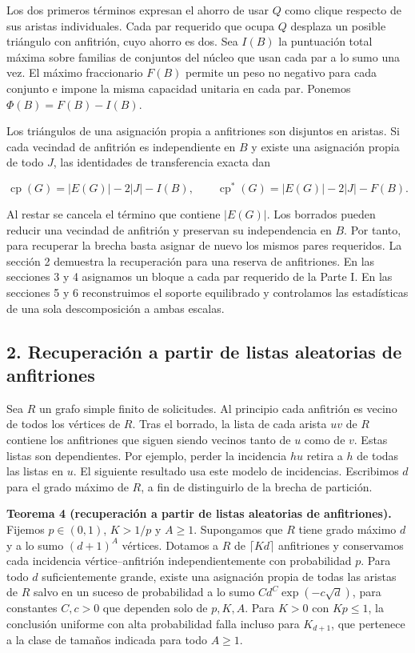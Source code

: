 \documentclass[spanish,11pt,a4paper]{article}
\begin{document}
Los dos primeros términos expresan el ahorro de usar \(Q\) como clique respecto de sus aristas individuales. Cada par requerido que ocupa \(Q\) desplaza un posible triángulo con anfitrión, cuyo ahorro es dos. Sea \(I(B)\) la puntuación total máxima sobre familias de conjuntos del núcleo que usan cada par a lo sumo una vez. El máximo fraccionario \(F(B)\) permite un peso no negativo para cada conjunto e impone la misma capacidad unitaria en cada par. Ponemos \(\Phi(B)=F(B)-I(B)\).

Los triángulos de una asignación propia a anfitriones son disjuntos en aristas. Si cada vecindad de anfitrión es independiente en \(B\) y existe una asignación propia de todo \(J\), las identidades de transferencia exacta dan

\[\operatorname{cp}(G)=|E(G)|-2|J|-I(B),\qquad
\operatorname{cp}^{\ast}(G)=|E(G)|-2|J|-F(B).
\tag{7}\]

Al restar se cancela el término que contiene \(|E(G)|\). Los borrados pueden reducir una vecindad de anfitrión y preservan su independencia en \(B\). Por tanto, para recuperar la brecha basta asignar de nuevo los mismos pares requeridos. La sección 2 demuestra la recuperación para una reserva de anfitriones. En las secciones 3 y 4 asignamos un bloque a cada par requerido de la Parte I. En las secciones 5 y 6 reconstruimos el soporte equilibrado y controlamos las estadísticas de una sola descomposición a ambas escalas.

\subsection{2. Recuperación a partir de listas aleatorias de anfitriones}\label{recuperaciuxf3n-a-partir-de-listas-aleatorias-de-anfitriones}

Sea \(R\) un grafo simple finito de solicitudes. Al principio cada anfitrión es vecino de todos los vértices de \(R\). Tras el borrado, la lista de cada arista \(uv\) de \(R\) contiene los anfitriones que siguen siendo vecinos tanto de \(u\) como de \(v\). Estas listas son dependientes. Por ejemplo, perder la incidencia \(hu\) retira a \(h\) de todas las listas en \(u\). El siguiente resultado usa este modelo de incidencias. Escribimos \(d\) para el grado máximo de \(R\), a fin de distinguirlo de la brecha de partición.

\textbf{Teorema 4 (recuperación a partir de listas aleatorias de anfitriones).} Fijemos \(p\in(0,1)\), \(K>1/p\) y \(A\ge1\). Supongamos que \(R\) tiene grado máximo \(d\) y a lo sumo \((d+1)^A\) vértices. Dotamos a \(R\) de \(\lceil Kd\rceil\) anfitriones y conservamos cada incidencia vértice--anfitrión independientemente con probabilidad \(p\). Para todo \(d\) suficientemente grande, existe una asignación propia de todas las aristas de \(R\) salvo en un suceso de probabilidad a lo sumo \(C d^{C}\exp(-c\sqrt d)\), para constantes \(C,c>0\) que dependen solo de \(p,K,A\). Para \(K>0\) con \(Kp\le1\), la conclusión uniforme con alta probabilidad falla incluso para \(K_{d+1}\), que pertenece a la clase de tamaños indicada para todo \(A\ge1\).
\end{document}
